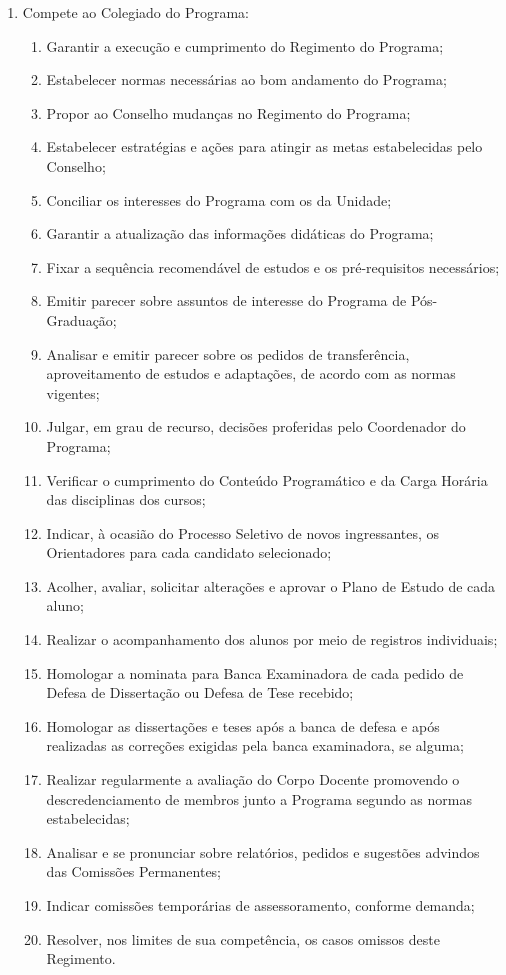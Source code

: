 \documentclass{article}
\newcommand{\grupoMenor}{Colegiado\xspace}
\newcommand{\grupoMaior}{Conselho\xspace}
\begin{document}
\begin{enumerate}
	\item Compete ao \grupoMenor do Programa:
	\begin{enumerate}[label=\Roman*]
		\item Garantir a execução e cumprimento do Regimento do Programa;
		\item Estabelecer normas necessárias ao bom andamento do Programa;
		\item Propor ao \grupoMaior mudanças no Regimento do Programa;
		\item Estabelecer estratégias e ações para atingir as metas estabelecidas pelo \grupoMaior;
		\item Conciliar os interesses do Programa com os da Unidade;
		\item Garantir a atualização das informações didáticas do Programa;
		\item Fixar a sequência recomendável de estudos e os pré-requisitos necessários;
		\item Emitir parecer sobre assuntos de interesse do Programa de Pós-Graduação;
		\item Analisar e emitir parecer sobre os pedidos de transferência, aproveitamento de estudos e adaptações, de acordo com as normas vigentes;
		\item Julgar, em grau de recurso, decisões proferidas pelo Coordenador do Programa;
		\item Verificar o cumprimento do Conteúdo Programático e da Carga Horária das disciplinas dos cursos;
		\item Indicar, à ocasião do Processo Seletivo de novos ingressantes, os Orientadores para cada candidato selecionado;	
		\item Acolher, avaliar, solicitar alterações e aprovar o Plano de Estudo de cada aluno;
		\item Realizar o acompanhamento dos alunos por meio de registros individuais;
		\item Homologar a nominata para Banca Examinadora de cada pedido de Defesa de Dissertação ou Defesa de Tese recebido;
		\item Homologar as dissertações e teses após a banca de defesa e após realizadas as correções exigidas pela banca examinadora, se alguma;
		\item Realizar regularmente a avaliação do Corpo Docente promovendo o descredenciamento de membros junto a Programa segundo as normas estabelecidas;
		\item Analisar e se pronunciar sobre relatórios, pedidos e sugestões advindos das Comissões Permanentes;
		\item Indicar comissões temporárias de assessoramento, conforme demanda;
		\item Resolver, nos limites de sua competência, os casos omissos deste Regimento.
	\end{enumerate}


\end{enumerate}
\end{document}
